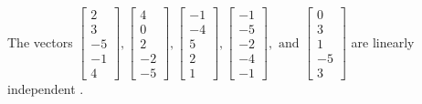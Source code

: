 \begin{exercise}
\begin{exerciseStatement}
  \end{exerciseStatement}
  \begin{exerciseAnswer}
   The vectors \(\left[\begin{array}{r}
2 \\
3 \\
-5 \\
-1 \\
4
\end{array}\right] , \left[\begin{array}{r}
4 \\
0 \\
2 \\
-2 \\
-5
\end{array}\right] , \left[\begin{array}{r}
-1 \\
-4 \\
5 \\
2 \\
1
\end{array}\right] , \left[\begin{array}{r}
-1 \\
-5 \\
-2 \\
-4 \\
-1
\end{array}\right] , \text{ and } \left[\begin{array}{r}
0 \\
3 \\
1 \\
-5 \\
3
\end{array}\right]\) are 
  	 linearly independent  .
  


  \end{exerciseAnswer}
\end{exercise}